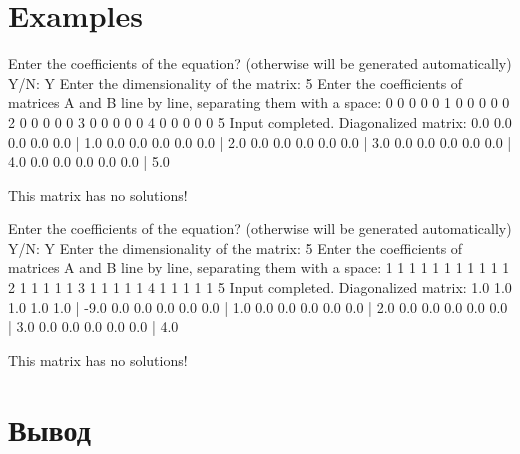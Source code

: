 \section{Examples}
Enter the coefficients of the equation? (otherwise will be generated automatically) Y/N: Y
Enter the dimensionality of the matrix: 5
Enter the coefficients of matrices A and B line by line, separating them with a space:
0 0 0 0 0 1
0 0 0 0 0 2
0 0 0 0 0 3
0 0 0 0 0 4
0 0 0 0 0 5
Input completed.
Diagonalized matrix:
		0.0 0.0 0.0 0.0 0.0 | 1.0
		0.0 0.0 0.0 0.0 0.0 | 2.0
		0.0 0.0 0.0 0.0 0.0 | 3.0
		0.0 0.0 0.0 0.0 0.0 | 4.0
		0.0 0.0 0.0 0.0 0.0 | 5.0

This matrix has no solutions!

Enter the coefficients of the equation? (otherwise will be generated automatically) Y/N: Y
Enter the dimensionality of the matrix: 5
Enter the coefficients of matrices A and B line by line, separating them with a space:
1 1 1 1 1 1
1 1 1 1 1 2
1 1 1 1 1 3
1 1 1 1 1 4
1 1 1 1 1 5
Input completed.
Diagonalized matrix:
		1.0 1.0 1.0 1.0 1.0 | -9.0
		0.0 0.0 0.0 0.0 0.0 | 1.0
		0.0 0.0 0.0 0.0 0.0 | 2.0
		0.0 0.0 0.0 0.0 0.0 | 3.0
		0.0 0.0 0.0 0.0 0.0 | 4.0

This matrix has no solutions!
\section{Вывод}